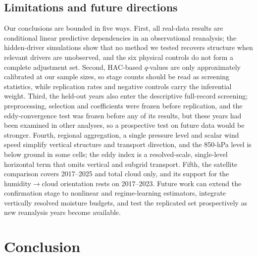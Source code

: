 \documentclass[preprint,12pt]{elsarticle}
\begin{document}
\subsection{Limitations and future directions}

Our conclusions are bounded in five ways. First, all real-data results are conditional linear predictive dependencies in an observational reanalysis; the hidden-driver simulations show that no method we tested recovers structure when relevant drivers are unobserved, and the six physical controls do not form a complete adjustment set. Second, HAC-based $q$-values are only approximately calibrated at our sample sizes, so stage counts should be read as screening statistics, while replication rates and negative controls carry the inferential weight. Third, the held-out years also enter the descriptive full-record screening; preprocessing, selection and coefficients were frozen before replication, and the eddy-convergence test was frozen before any of its results, but these years had been examined in other analyses, so a prospective test on future data would be stronger. Fourth, regional aggregation, a single pressure level and scalar wind speed simplify vertical structure and transport direction, and the 850-hPa level is below ground in some cells; the eddy index is a resolved-scale, single-level horizontal term that omits vertical and subgrid transport. Fifth, the satellite comparison covers 2017--2025 and total cloud only, and its support for the humidity$\rightarrow$cloud orientation rests on 2017--2023. Future work can extend the confirmation stage to nonlinear and regime-learning estimators, integrate vertically resolved moisture budgets, and test the replicated set prospectively as new reanalysis years become available.

\section{Conclusion}
\label{sec:conclusion}
\end{document}
